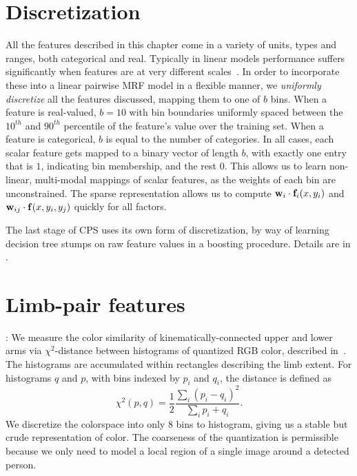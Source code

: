 \section{Discretization}
All the features described in this chapter come in a variety of units, types 
and ranges, both categorical and real.  Typically in linear models performance 
suffers significantly when features are at very different 
scales~\citep{liblinear}.  In order to incorporate these into a linear pairwise 
MRF model in a flexible manner, we {\em uniformly discretize} all the features 
discussed, mapping them to one of $b$ bins.  When a feature is real-valued, $b 
= 10$ with bin boundaries uniformly spaced between the $10^{th}$ and $90^{th}$ 
percentile of the feature's value over the training set.  When a feature is 
categorical, $b$ is equal to the number of categories.  In all cases, each 
scalar feature gets mapped to a binary vector of length $b$, with exactly one 
entry that is $1$, indicating bin membership, and the rest $0$.   This allows 
us to learn non-linear, multi-modal mappings of scalar features, as the weights 
of each bin are unconstrained.  The sparse representation allows us to compute 
$\mathbf{w}_i \cdot \mathbf{f}_i(x,y_i)$ and $\mathbf{w}_{ij} \cdot \mathbf{f}(x,y_i,y_j)$ quickly for all 
factors.

The last stage of CPS uses its own form of discretization, by way of learning 
decision tree stumps on raw feature values in a boosting procedure.  Details 
are in .


\section{Limb-pair features}\label{sec:limb-limb}
: We measure the color similarity of 
kinematically-connected upper and lower arms via $\chi^2$-distance between 
histograms of quantized RGB color, described in~.  The histograms 
are accumulated within rectangles describing the limb extent. For histograms 
$q$ and $p$, with bins indexed by $p_i$ and $q_i$, the distance is defined as
$$\chi^2(p,q) = \frac{1}{2} \frac{\sum_i (p_i - q_i)^2}{\sum_i p_i + q_i}.$$  
We discretize the colorspace into only $8$ bins to histogram, giving us a 
stable but crude representation of color.  The coarseness of the quantization 
is permissible because we only need to model a local region of a single image 
around a detected person.


